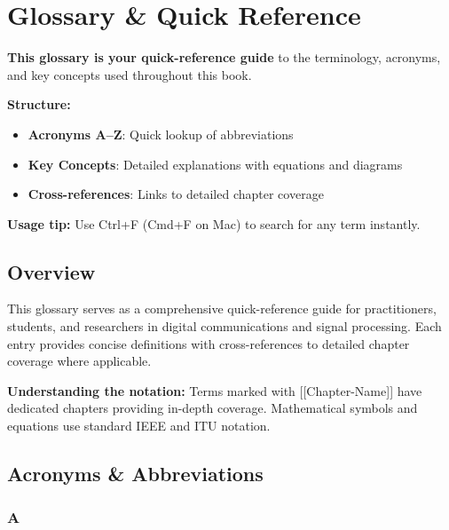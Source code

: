 \chapter{Glossary \& Quick Reference}\label{ch:glossary}

\begin{nontechnical}
\textbf{This glossary is your quick-reference guide} to the terminology, acronyms, and key concepts used throughout this book.

\textbf{Structure:}
\begin{itemize}
\item \textbf{Acronyms A--Z}: Quick lookup of abbreviations
\item \textbf{Key Concepts}: Detailed explanations with equations and diagrams
\item \textbf{Cross-references}: Links to detailed chapter coverage
\end{itemize}

\textbf{Usage tip:} Use Ctrl+F (Cmd+F on Mac) to search for any term instantly.
\end{nontechnical}

\section{Overview}

This glossary serves as a comprehensive quick-reference guide for practitioners, students, and researchers in digital communications and signal processing. Each entry provides concise definitions with cross-references to detailed chapter coverage where applicable.

\begin{keyconcept}
\textbf{Understanding the notation:} Terms marked with {[}{[}Chapter-Name{]}{]} have dedicated chapters providing in-depth coverage. Mathematical symbols and equations use standard IEEE and ITU notation.
\end{keyconcept}

\section{Acronyms \& Abbreviations}

\subsection{A}\label{a}

